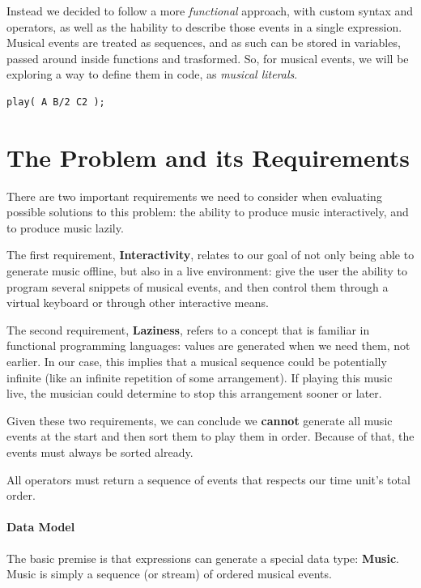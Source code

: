 \documentclass[a4paper,UKenglish,cleveref, autoref]{oasics-v2019}
\begin{document}
Instead we decided to follow a more \textit{functional} approach, with custom syntax and operators, as well as the hability to describe those events in a single expression. Musical events are treated as sequences, and as such can be stored in variables, passed around inside functions and trasformed. So, for musical events, we will be exploring a way to define them in code, as \textit{musical literals}.

\begin{lstlisting}[caption={Our proposed declarative syntax that calculates timings implicitly},label=list:2,captionpos=t,abovecaptionskip=-\medskipamount]
play( A B/2 C2 );
\end{lstlisting}

\section{The Problem and its Requirements}
There are two important requirements we need to consider when evaluating possible solutions to this problem: the ability to produce music interactively, and to produce music lazily.

The first requirement, \textbf{Interactivity}, relates to our goal of not only being able to generate music offline, but also in a live environment: give the user the ability to program several snippets of musical events, and then control them through a virtual keyboard or through other interactive means.

The second requirement, \textbf{Laziness}, refers to a concept that is familiar in functional programming languages: values are generated when we need them, not earlier. In our case, this implies that a musical sequence could be potentially infinite (like an infinite repetition of some arrangement). If playing this music live, the musician could determine to stop this arrangement sooner or later.

Given these two requirements, we can conclude we \textbf{cannot} generate all music events at the start and then sort them to play them in order. Because of that, the events must always be sorted already.

\begin{lemma}
\label{lemma:total-order} All operators must return a sequence of events that respects our time unit's total order.
\end{lemma}

\paragraph*{Data Model}
The basic premise is that expressions can generate a special data type: \textbf{Music}. Music is simply a sequence (or stream) of ordered musical events.
\end{document}
